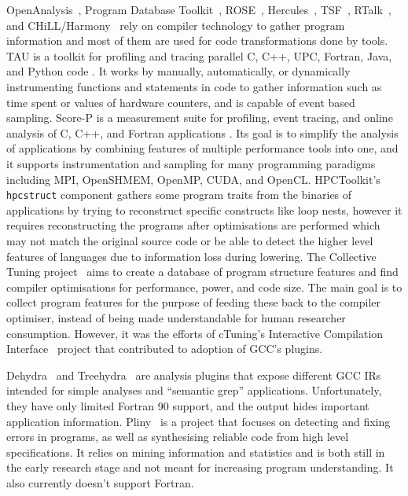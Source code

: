 OpenAnalysis~\cite{Strout:2005}, Program Database Toolkit~\cite{Lindlan2000}, ROSE~\cite{Willcock:2009:RGP:1621607.1621611}, Hercules~\cite{kartsaklis2012hercules}, TSF~\cite{bodin1998user}, RTalk~\cite{SPE:SPE1035}, and CHiLL/Harmony~\cite{tiwari2009scalable} rely on compiler technology to gather program information and most of them are used for code transformations done by tools.
TAU is a toolkit for profiling and tracing parallel C, C++, \ac{UPC}, Fortran, Java, and Python code \cite{Shende:2006:TPP:1125980.1125982}.
It works by manually, automatically, or dynamically instrumenting functions and statements in code to gather information such as time spent or values of hardware counters, and is capable of event based sampling.
Score-P is a measurement suite for profiling, event tracing, and online analysis of C, C++, and Fortran applications \cite{10.1007/978-3-642-31476-6_7}.
Its goal is to simplify the analysis of applications by combining features of multiple performance tools into one, and it supports instrumentation and sampling for many programming paradigms including \acs{MPI}, OpenSHMEM, OpenMP, CUDA, and OpenCL.
HPCToolkit's~\cite{Adhianto2010} \texttt{hpcstruct} component gathers some program traits from the binaries of applications by trying to reconstruct specific constructs like loop nests, however it requires reconstructing the programs after optimisations are performed which may not match the original source code or be able to detect the higher level features of languages due to information loss during lowering.
The Collective Tuning project~\cite{Fursin:2016} aims to create a database of program structure features and find compiler optimisations for performance, power, and code size.
The main goal is to collect program features for the purpose of feeding these back to the compiler optimiser, instead of being made understandable for human researcher consumption.
However, it was the efforts of cTuning's Interactive Compilation Interface~\cite{ctuning-ici} project that contributed to adoption of \acs{GCC}'s plugins. 

Dehydra~\cite{dehydra} and Treehydra~\cite{treehydra} are analysis plugins that expose different \acs{GCC} \acp{IR} intended for simple analyses and ``semantic grep'' applications.
Unfortunately, they have only limited Fortran 90 support, and the output hides important application information.
Pliny~\cite{Feser:2015} is a project that focuses on detecting and fixing errors in programs, as well as synthesising reliable code from high level specifications.
It relies on mining information and statistics and is both still in the early research stage and not meant for increasing program understanding.
It also currently doesn't support Fortran.

